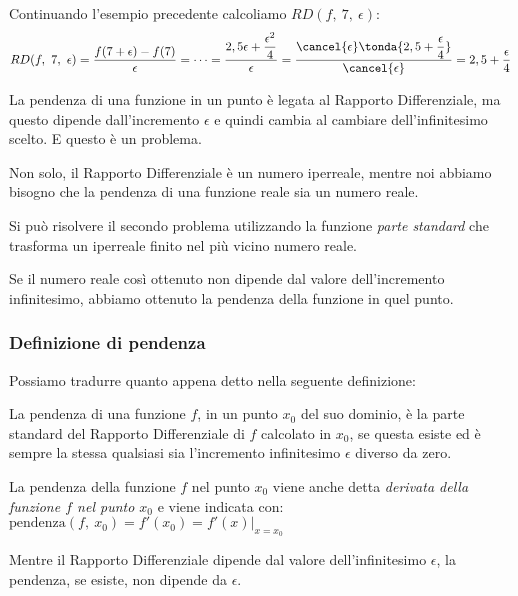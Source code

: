 Continuando l'esempio precedente calcoliamo \(RD(f,~7,~\epsilon)\):
\[RD(f,~7,~\epsilon) =
 \frac{f(7+\epsilon) - f(7)}{\epsilon}=\dots=
 \frac{2,5 \epsilon + \dfrac{\epsilon^2}{4}}{\epsilon}=
 \frac{\cancel{\epsilon}\tonda{2,5 + \dfrac{\epsilon}{4}}}
 {\cancel{\epsilon}}=
 2,5 + \frac{\epsilon}{4}
\]

La pendenza di una funzione in un punto è legata al Rapporto Differenziale, 
ma questo dipende dall'incremento \(\epsilon\) e quindi cambia al cambiare 
dell'infinitesimo scelto. 
E questo è un problema. 

Non solo, il Rapporto Differenziale è un numero iperreale, mentre noi 
abbiamo bisogno che la pendenza di una funzione reale sia un numero reale.

Si può risolvere il secondo problema utilizzando la funzione 
\emph{parte standard} che trasforma un iperreale finito nel più vicino
numero reale.

Se il numero reale così ottenuto non dipende dal valore dell'incremento 
infinitesimo, abbiamo ottenuto la pendenza della funzione in quel punto.

\subsubsection{Definizione di pendenza}
Possiamo tradurre quanto appena detto nella seguente definizione: 
\begin{definizione}
La pendenza di una funzione \(f\), in un punto \(x_0\) del suo dominio, 
è la parte standard del Rapporto Differenziale di \(f\) calcolato in 
\(x_0\), se questa esiste ed è sempre la stessa qualsiasi sia 
l'incremento infinitesimo \(\epsilon\) diverso da zero.
\end{definizione}

La pendenza della funzione \(f\) nel punto \(x_0\) 
viene anche detta \emph{derivata della funzione \(f\) nel punto \(x_0\)} e 
viene indicata con: \quad 
\(\text{pendenza}(f,~x_0) = f'(x_0) = f'(x) \big|_{x=x_0}\)

\begin{osservazione}
Mentre il Rapporto Differenziale dipende dal valore dell'infinitesimo 
\(\epsilon\), la pendenza, se esiste, non dipende da \(\epsilon\).
\end{osservazione}

